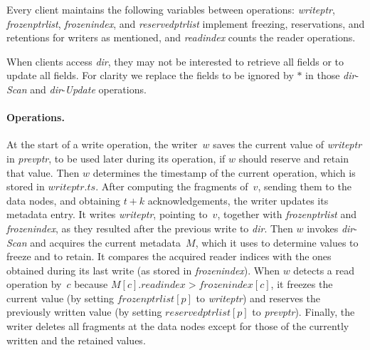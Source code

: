 \documentclass[oribibl]{llncs}
\theoremstyle{definition-boldhead}
\newcommand{\var}[1]{\textit{#1}}
\newcommand{\op}[1]{\textsl{#1}}
\newcommand{\dir}{\var{dir}\xspace}
\newcommand{\nodes}{nodes\xspace}
\begin{document}
Every client maintains the following variables between operations:
\var{writeptr}, \var{frozenptrlist}, \var{frozenindex}, and
\var{reservedptrlist} implement freezing, reservations, and retentions
for writers as mentioned, and \var{readindex} counts the reader
operations.

When clients access \dir, they may not be interested to retrieve all
fields or to update all fields.  For clarity we replace the fields to
be ignored by $\ast$ in those \dir-\op{Scan} and \dir-\op{Update}
operations.


\paragraph{Operations.}
At the start of a write operation, the writer~$w$ saves the current
value of \var{writeptr} in \var{prevptr}, to be used later during its
operation, if $w$ should reserve and retain that value.  Then $w$
determines the timestamp of the current operation, which is stored in
$\var{writeptr}.\var{ts}$.  After computing the fragments of~$v$,
sending them to the data \nodes, and obtaining $t+k$ acknowledgements,
the writer updates its metadata entry.  It writes \var{writeptr},
pointing to~$v$, together with \var{frozenptrlist} and
\var{frozenindex}, as they resulted after the previous write to \dir.  Then
$w$ invokes \dir-\op{Scan} and acquires the current metadata~$M$,
which it uses to determine values to freeze and to retain.  It
compares the acquired reader indices with the ones obtained during its
last write (as stored in \var{frozenindex}).  When $w$ detects a read
operation by~$c$ because $M[c].\var{readindex} >
\var{frozenindex}[c]$, it freezes the current value (by setting
$\var{frozenptrlist}[p]$ to \var{writeptr})
and reserves the previously written value (by setting
$\var{reservedptrlist}[p]$ to \var{prevptr}).  Finally, the writer
deletes all fragments at the data \nodes except for those of the
currently written and the retained values.
\end{document}
